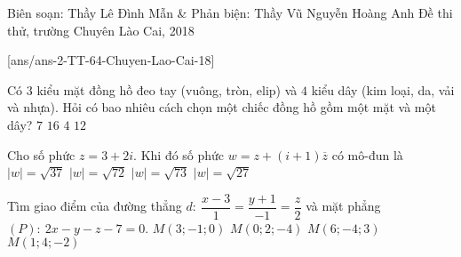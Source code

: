 \begin{name}
{Biên soạn: Thầy Lê Đình Mẫn \& Phản biện: Thầy Vũ Nguyễn Hoàng Anh }
{Đề thi thử, trường Chuyên Lào Cai, 2018}
\end{name}
\setcounter{ex}{0}
[ans/ans-2-TT-64-Chuyen-Lao-Cai-18]
\begin{ex}%
Có $3$ kiểu mặt đồng hồ đeo tay (vuông, tròn, elip) và $4$ kiểu dây (kim loại, da, vải và nhựa). Hỏi có bao nhiêu cách chọn một chiếc đồng hồ gồm một mặt và một dây?
\choice
{$7$}
{$16$}
{$4$}
{\True $12$}
\end{ex}
\begin{ex}%
Cho số phức $z=3+2i$. Khi đó số phức $w=z+(i+1)\overline{z}$ có mô-đun là
\choice
{$|w|=\sqrt{37}$}
{$|w|=\sqrt{72}$}
{\True $|w|=\sqrt{73}$}
{$|w|=\sqrt{27}$}
\end{ex}
\begin{ex}%
Tìm giao điểm của đường thẳng $d:\ \dfrac{x-3}{1}=\dfrac{y+1}{-1}=\dfrac{z}{2}$ và mặt phẳng $(P):\ 2x-y-z-7=0.$
\choice
{\True $M(3;-1;0)$}
{$M(0;2;-4)$}
{$M(6;-4;3)$}
{$M(1;4;-2)$}
\end{ex}
